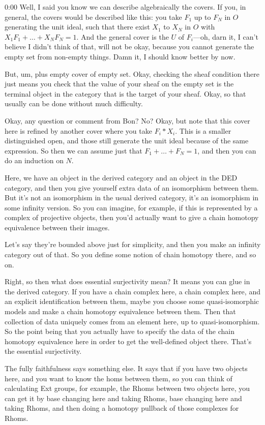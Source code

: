 \begin{unfinished}{0:00}
Well, I said you know we can describe algebraically the covers. If you, in general, the covers would be described like this: you take $F_1$ up to $F_N$ in $O$ generating the unit ideal, such that there exist $X_1$ to $X_N$ in $O$ with $X_1 F_1 + \dots + X_N F_N = 1$. And the general cover is the $U$ of $F_i$---oh, darn it, I can't believe I didn't think of that, will not be okay, because you cannot generate the empty set from non-empty things. Damn it, I should know better by now.

But, um, plus empty cover of empty set. Okay, checking the sheaf condition there just means you check that the value of your sheaf on the empty set is the terminal object in the category that is the target of your sheaf. Okay, so that usually can be done without much difficulty.

Okay, any question or comment from Bon? No? Okay, but note that this cover here is refined by another cover where you take $F_i * X_i$. This is a smaller distinguished open, and those still generate the unit ideal because of the same expression. So then we can assume just that $F_1 + \dots + F_N = 1$, and then you can do an induction on $N$.

Here, we have an object in the derived category and an object in the DED category, and then you give yourself extra data of an isomorphism between them. But it's not an isomorphism in the usual derived category, it's an isomorphism in some infinity version. So you can imagine, for example, if this is represented by a complex of projective objects, then you'd actually want to give a chain homotopy equivalence between their images.

Let's say they're bounded above just for simplicity, and then you make an infinity category out of that. So you define some notion of chain homotopy there, and so on.

Right, so then what does essential surjectivity mean? It means you can glue in the derived category. If you have a chain complex here, a chain complex here, and an explicit identification between them, maybe you choose some quasi-isomorphic models and make a chain homotopy equivalence between them. Then that collection of data uniquely comes from an element here, up to quasi-isomorphism. So the point being that you actually have to specify the data of the chain homotopy equivalence here in order to get the well-defined object there. That's the essential surjectivity.

The fully faithfulness says something else. It says that if you have two objects here, and you want to know the homs between them, so you can think of calculating Ext groups, for example, the Rhoms between two objects here, you can get it by base changing here and taking Rhoms, base changing here and taking Rhoms, and then doing a homotopy pullback of those complexes for Rhoms.


\end{unfinished}
